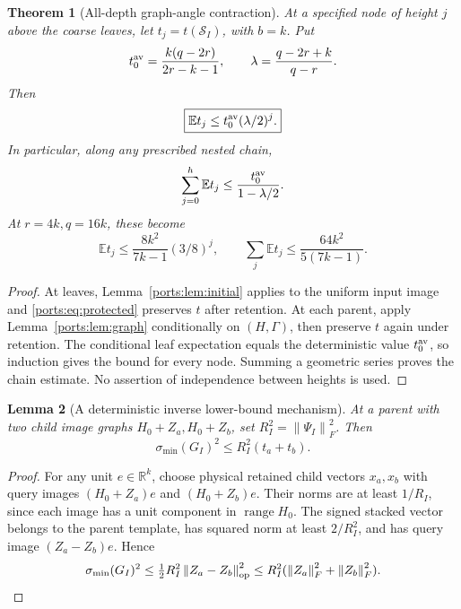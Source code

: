 \documentclass[11pt,oneside,openany,a4paper]{book}
\numberwithin{equation}{chapter}
\newtheorem{theorem}{Theorem}[chapter]
\newtheorem{lemma}[theorem]{Lemma}
\theoremstyle{definition}
\theoremstyle{remark}
\newcommand{\R}{\mathbb R}\newcommand{\E}{\mathbb E}\newcommand{\Prb}{\mathbb P}\newcommand{\PP}{\mathbb P}
\newcommand{\F}[1]{\left\lVert#1\right\rVert_F}
\newcommand{\op}[1]{\left\lVert#1\right\rVert_{\rm op}}
\DeclareMathOperator{\ran}{range}\DeclareMathOperator{\OPT}{OPT}
\begin{document}
\begin{theorem}[All-depth graph-angle contraction]\label{ports:thm:angles}
At a specified node of height $j$ above the coarse leaves, let $t_j=t(\mathscr S_I)$, with $b=k$. Put
\[
 t_0^{\rm av}=\frac{k(q-2r)}{2r-k-1},\qquad
 \lambda=\frac{q-2r+k}{q-r}.
\]
Then
\begin{equation}\label{ports:eq:angleheight}
 \boxed{\E t_j\le t_0^{\rm av}(\lambda/2)^j.}
\end{equation}
In particular, along any prescribed nested chain,
\begin{equation}\label{ports:eq:anglesum}
 \sum_{j=0}^h\E t_j\le\frac{t_0^{\rm av}}{1-\lambda/2}.
\end{equation}
At $r=4k,q=16k$, these become
\begin{equation}\label{ports:eq:explicitangle}
 \E t_j\le\frac{8k^2}{7k-1}(3/8)^j,
 \qquad
 \sum_j\E t_j\le\frac{64k^2}{5(7k-1)}.
\end{equation}
\end{theorem}
\begin{proof}
At leaves, Lemma~\ref{ports:lem:initial} applies to the uniform input image and \eqref{ports:eq:protected} preserves $t$ after retention. At each parent, apply Lemma~\ref{ports:lem:graph} conditionally on $(H,\Gamma)$, then preserve $t$ again under retention. The conditional leaf expectation equals the deterministic value $t_0^{\rm av}$, so induction gives the bound for every node. Summing a geometric series proves the chain estimate. No assertion of independence between heights is used.
\end{proof}

\begin{lemma}[A deterministic inverse lower-bound mechanism]\label{ports:lem:singular}
At a parent with two child image graphs $H_0+Z_a,H_0+Z_b$, set $R_I^2=\F{\Psi_I}^2$. Then
\begin{equation}\label{ports:eq:smin}
 \sigma_{\min}(G_I)^2\le R_I^2(t_a+t_b).
\end{equation}
\end{lemma}
\begin{proof}
For any unit $e\in\R^k$, choose physical retained child vectors $x_a,x_b$ with query images $(H_0+Z_a)e$ and $(H_0+Z_b)e$. Their norms are at least $1/R_I$, since each image has a unit component in $\ran H_0$. The signed stacked vector belongs to the parent template, has squared norm at least $2/R_I^2$, and has query image $(Z_a-Z_b)e$. Hence
\[
 \sigma_{\min}(G_I)^2
 \le\tfrac12R_I^2\op{Z_a-Z_b}^2
 \le R_I^2(\F{Z_a}^2+\F{Z_b}^2).
\]
\end{proof}
\end{document}
